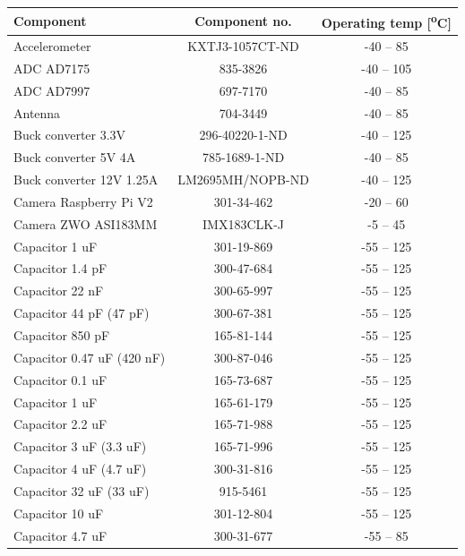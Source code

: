 \begin{center}
  \begin{tabular}{ | l | c | c |}
    \hline
    \textbf{Component} & \textbf{Component no.} & \textbf{Operating temp [\textsuperscript{o}C]} \\ 
    \hline
    Accelerometer & KXTJ3-1057CT-ND & -40 – 85 \\ 
    \hline
    ADC AD7175 & 835-3826 & -40 – 105 \\ 
    \hline
    ADC AD7997 & 697-7170 & -40 – 85 \\ 
    \hline
    Antenna & 704-3449 & -40 – 85 \\ 
    \hline
    Buck converter 3.3V & 296-40220-1-ND & -40 – 125 \\ 
    \hline
    Buck converter 5V 4A & 785-1689-1-ND & -40 – 85 \\ 
    \hline
    Buck converter 12V 1.25A & LM2695MH/NOPB-ND & -40 – 125 \\ 
    \hline
    Camera Raspberry Pi V2 & 301-34-462 & -20 – 60 \\ 
    \hline
    Camera  ZWO ASI183MM & IMX183CLK-J & -5 – 45 \\ 
    \hline
    Capacitor 1 uF & 301-19-869 & -55 – 125 \\ 
    \hline
    Capacitor 1.4 pF & 300-47-684 & -55 – 125\\ 
    \hline
    Capacitor 22 nF & 300-65-997 & -55 – 125 \\ 
    \hline
    Capacitor 44 pF (47 pF) & 300-67-381 & -55 – 125 \\ 
    \hline
    Capacitor 850 pF & 165-81-144 & -55 – 125 \\ 
    \hline
    Capacitor 0.47 uF (420 nF) & 300-87-046 & -55 – 125 \\ 
    \hline
    Capacitor 0.1 uF & 165-73-687 & -55 – 125 \\ 
    \hline
    Capacitor 1 uF & 165-61-179 & -55 – 125 \\ 
    \hline
    Capacitor 2.2 uF & 165-71-988 & -55 – 125 \\ 
    \hline
    Capacitor 3 uF (3.3 uF) & 165-71-996 & -55 – 125 \\ 
    \hline
    Capacitor 4 uF (4.7 uF) & 300-31-816 & -55 – 125 \\ 
    \hline
    Capacitor 32 uF (33 uF) & 915-5461 & -55 – 125 \\ 
    \hline
    Capacitor 10 uF & 301-12-804 & -55 – 125 \\ 
    \hline
    Capacitor 4.7 uF & 300-31-677 & -55 – 85 \\ 

\end{tabular}
\end{center}
